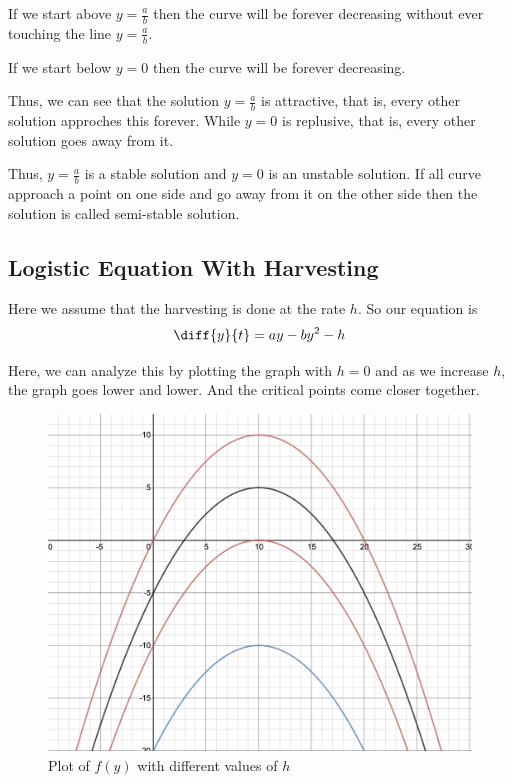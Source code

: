 If we start above $y = \frac{a}{b}$ then the curve will be forever decreasing without ever touching the line $y = \frac{a}{b}$.

If we start below $y = 0$ then the curve will be forever decreasing.

Thus, we can see that the solution $y = \frac{a}{b}$ is attractive, that is, every other solution approches this forever.
While $y = 0$ is replusive, that is, every other solution goes away from it.

Thus, $y = \frac{a}{b}$ is a stable solution and $y = 0$ is an unstable solution.
If all curve approach a point on one side and go away from it on the other side then the solution is called semi-stable solution.
\pagebreak
\subsection{Logistic Equation With Harvesting}

Here we assume that the harvesting is done at the rate $h$. 
So our equation is 
$$ \diff{y}{t} = ay - by^2 - h $$

Here, we can analyze this by plotting the graph with $h = 0$ and as we increase $h$, the graph goes lower and lower.
And the critical points come closer together.

\begin{figure}[ht!]
    \centering
    \includegraphics[scale=0.3]{./images/lecture_5_figure_4.png}
    \caption{Plot of $f(y)$ with different values of $h$}
\end{figure}


